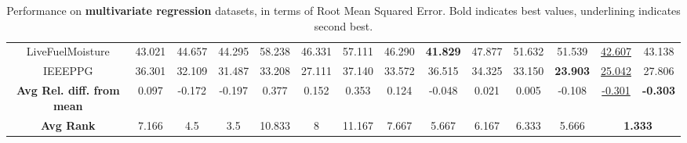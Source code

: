 \documentclass{article} \usepackage{iclr2021_conference,times}
\begin{document}
\begin{table}
\begin{adjustbox}{width=1.2\textwidth,center=\textwidth}
\begin{tabular}{|c|c|c|c|c|c|c|c|c|c|c|c|c|c|}
LiveFuelMoisture                   & 43.021               & 44.657                                                                                     & 44.295               & 58.238               & 46.331                                                               & 57.111                                                                 & 46.290                                                                 & \textbf{41.829}      & 47.877               & 51.632               & 51.539              & \uline{42.607}                                                               & 43.138                                                                         \\
IEEEPPG                            & 36.301               & 32.109                                                                                     & 31.487               & 33.208               & 27.111                                                               & 37.140                                                                 & 33.572                                                                 & 36.515               & 34.325               & 33.150               & \textbf{23.903}     & \uline{25.042}                                                               & 27.806                                                                         \\ 
\hline\hline
\textbf{Avg Rel. diff. from mean}  & 0.097                & -0.172                                                                                     & -0.197               & 0.377                & 0.152                                                                & 0.353                                                                  & 0.124                                                                  & -0.048               & 0.021                & 0.005                & -0.108              &  \uline{-0.301}                                                              &  \textbf{-0.303 }                                                              \\ 
\hline
\textbf{Avg Rank}                  & 7.166                & 4.5                                                                                        & 3.5                  & 10.833               & 8                                                                    & 11.167                                                                 & 7.667                                                                  & 5.667                & 6.167                & 6.333                & 5.666               & \multicolumn{2}{c|}{\textbf{1.333} }                                                                                                                          \\
\hline
\end{tabular}
\end{adjustbox}
\caption{Performance on \textbf{multivariate regression} datasets, in terms of Root Mean Squared Error. Bold indicates best values, underlining indicates second best.}
\label{tab:performance_regression}
\end{table}
\end{document}
